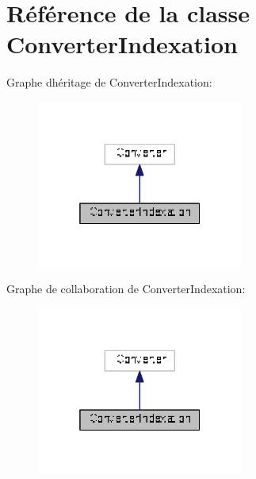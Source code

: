 \hypertarget{class_converter_indexation}{}\section{Référence de la classe Converter\+Indexation}
\label{class_converter_indexation}


Graphe d\textquotesingle{}héritage de Converter\+Indexation\+:
\nopagebreak
\begin{figure}[H]
\begin{center}
\leavevmode
\includegraphics[width=193pt]{class_converter_indexation__inherit__graph}
\end{center}
\end{figure}


Graphe de collaboration de Converter\+Indexation\+:
\nopagebreak
\begin{figure}[H]
\begin{center}
\leavevmode
\includegraphics[width=193pt]{class_converter_indexation__coll__graph}
\end{center}
\end{figure}
